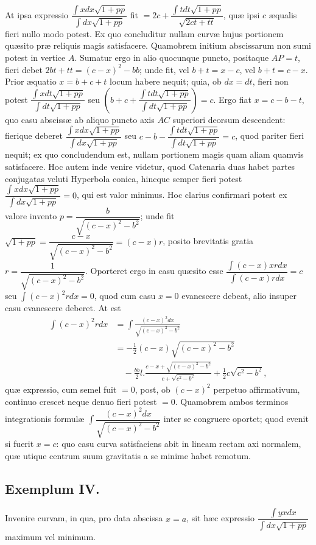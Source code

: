 At ipsa expressio $\dfrac{\int xdx\sqrt{1+pp}}{\int dx\sqrt{1+pp}}$ fit $=2c+\dfrac{\int tdt\sqrt{1+pp}}{\sqrt{2ct+tt}}$, quæ ipsi $c$ æqualis fieri nullo modo potest. Ex quo concluditur nullam curvæ hujus portionem quæsito præ reliquis magis satisfacere. Quamobrem initium abscissarum non sumi potest in vertice $A$. Sumatur ergo in alio quocunque puncto, positaque $AP=t$, fieri debet $2bt+tt=(c-x)^2-bb$; unde fit, vel $b+t=x-c$, vel $b+t=c-x$. Prior æquatio $x=b+c+t$ locum habere nequit; quia, ob $dx=dt$, fieri non potest $\dfrac{\int xdt\sqrt{1+pp}}{\int dt\sqrt{1+pp}}$ seu $\left(b+c+\dfrac{\int tdt\sqrt{1+pp}}{\int dt\sqrt{1+pp}}\right)=c$. Ergo fiat $x=c-b-t$, quo casu abscissæ ab aliquo puncto axis $AC$ superiori deorsum descendent: fierique deberet $\dfrac{\int xdx\sqrt{1+pp}}{\int dx\sqrt{1+pp}}$ seu $c-b-\dfrac{\int tdt\sqrt{1+pp}}{\int dt\sqrt{1+pp}}=c$, quod pariter fieri nequit; ex quo concludendum est, nullam portionem magis quam aliam quamvis satisfacere. Hoc autem inde venire videtur, quod Catenaria duas habet partes conjugatas veluti Hyperbola conica, hincque semper fieri potest $\dfrac{\int xdx\sqrt{1+pp}}{\int dx\sqrt{1+pp}}=0$, qui est valor minimus. Hoc clarius confirmari potest ex valore invento $p=\dfrac{b}{\sqrt{(c-x)^2-b^2}}$; unde fit $\sqrt{1+pp}=\dfrac{c-x}{\sqrt{(c-x)^2-b^2}}=(c-x)r$, posito brevitatis gratia $r=\dfrac{1}{\sqrt{(c-x)^2-b^2}}$. Oporteret ergo in casu quæsito esse $\dfrac{\int(c-x)xrdx}{\int(c-x)rdx}=c$ seu $\int(c-x)^2rdx=0$, quod cum casu $x=0$ evanescere debeat, alio insuper casu evanescere deberet. At est
\[\begin{aligned}\int(c-x)^2rdx&=\int\frac{(c-x)^2dx}{\sqrt{(c-x)^2-b^2}}\\&=-\tfrac12(c-x)\sqrt{(c-x)^2-b^2}\\&\quad-\frac{bb}{2}l.\frac{c-x+\sqrt{(c-x)^2-b^2}}{c+\sqrt{c^2-b^2}}+\tfrac12c\sqrt{c^2-b^2},\end{aligned}\]
quæ expressio, cum semel fuit $=0$, post, ob $(c-x)^2$ perpetuo affirmativum, continuo crescet neque denuo fieri potest $=0$. Quamobrem ambos terminos integrationis formulæ $\int\dfrac{(c-x)^2dx}{\sqrt{(c-x)^2-b^2}}$ inter se congruere oportet; quod evenit si fuerit $x=c$: quo casu curva satisfaciens abit in lineam rectam axi normalem, quæ utique centrum suum gravitatis a se minime habet remotum.
\subsection*{Exemplum IV.}
Invenire curvam, in qua, pro data abscissa $x=a$, sit hæc expressio $\dfrac{\int yxdx}{\int dx\sqrt{1+pp}}$ maximum vel minimum.

